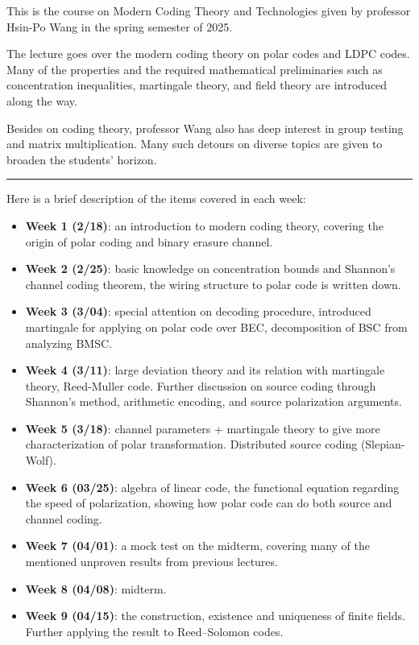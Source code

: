 This is the course on Modern Coding Theory and Technologies given by professor Hsin-Po Wang in the spring semester of 2025.

The lecture goes over the modern coding theory on polar codes and LDPC codes. Many of the properties and the required mathematical preliminaries such as concentration inequalities, martingale theory, and field theory are introduced along the way.

Besides on coding theory, professor Wang also has deep interest in group testing and matrix multiplication. Many such detours on diverse topics are given to broaden the students' horizon.

\vspace{1cm}
\hrule

Here is a brief description of the items covered in each week:
\begin{itemize}
    \item \textbf{Week 1 (2/18)}: an introduction to modern coding theory, covering the origin of polar coding and binary erasure channel.
    \item \textbf{Week 2 (2/25)}: basic knowledge on concentration bounds and Shannon's channel coding theorem, the wiring structure to polar code is written down.
    \item \textbf{Week 3 (3/04)}: special attention on decoding procedure, introduced martingale for applying on polar code over BEC, decomposition of BSC from analyzing BMSC.
    \item \textbf{Week 4 (3/11)}: large deviation theory and its relation with martingale theory, Reed-Muller code. Further discussion on source coding through Shannon's method, arithmetic encoding, and source polarization arguments.
    \item \textbf{Week 5 (3/18)}: channel parameters + martingale theory to give more characterization of polar transformation. Distributed source coding (Slepian-Wolf).
    \item \textbf{Week 6 (03/25)}: algebra of linear code, the functional equation regarding the speed of polarization, showing how polar code can do both source and channel coding.
    \item \textbf{Week 7 (04/01)}: a mock test on the midterm, covering many of the mentioned unproven results from previous lectures.
    \item \textbf{Week 8 (04/08)}: midterm.
    \item \textbf{Week 9 (04/15)}: the construction, existence and uniqueness of finite fields. Further applying the result to Reed--Solomon codes.

\end{itemize}
